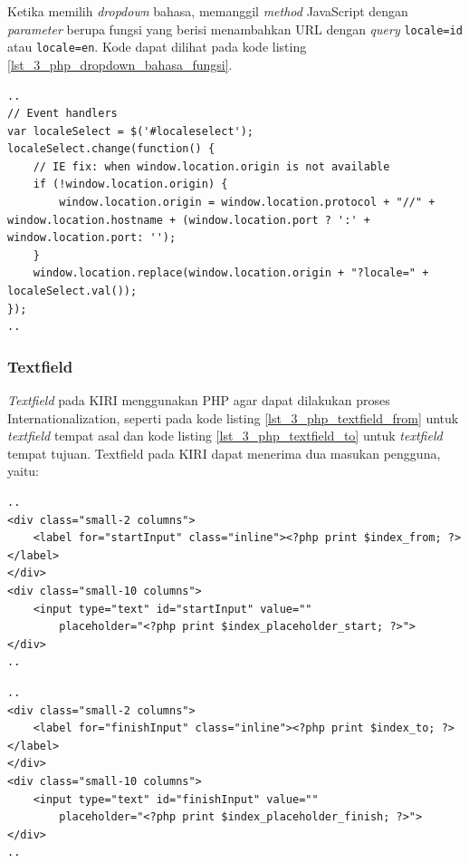 Ketika memilih \textit{dropdown} bahasa, memanggil \textit{method} JavaScript dengan \textit{parameter} berupa fungsi yang berisi menambahkan URL dengan \textit{query} \verb!locale=id! atau \verb!locale=en!. Kode dapat dilihat pada kode listing \ref{lst_3_php_dropdown_bahasa_fungsi}.

\begin{lstlisting}[caption=Fungsi JavaScript untuk Internationalization ,label = {lst_3_php_dropdown_bahasa_fungsi}]
..
// Event handlers
var localeSelect = $('#localeselect');
localeSelect.change(function() {
	// IE fix: when window.location.origin is not available 
	if (!window.location.origin) {
		window.location.origin = window.location.protocol + "//" + window.location.hostname + (window.location.port ? ':' + window.location.port: '');
	}
	window.location.replace(window.location.origin + "?locale=" + localeSelect.val());
});
..
\end{lstlisting}


\subsubsection{Textfield}
\textit{Textfield} pada KIRI menggunakan PHP agar dapat dilakukan proses Internationalization, seperti pada kode listing \ref{lst_3_php_textfield_from} untuk \textit{textfield} tempat asal dan kode listing \ref{lst_3_php_textfield_to} untuk \textit{textfield} tempat tujuan. Textfield pada KIRI dapat menerima dua masukan pengguna, yaitu:

\begin{lstlisting}[caption=Menampilkan \textit{textfield} tempat awal kepada pengguna ,label = {lst_3_php_textfield_from}]
..
<div class="small-2 columns">
	<label for="startInput" class="inline"><?php print $index_from; ?></label>
</div>
<div class="small-10 columns">
	<input type="text" id="startInput" value=""
		placeholder="<?php print $index_placeholder_start; ?>">
</div>
..
\end{lstlisting}

\begin{lstlisting}[caption=Menampilkan \textit{textfield} tempat tujuan kepada pengguna ,label = {lst_3_php_textfield_to}]
..
<div class="small-2 columns">
	<label for="finishInput" class="inline"><?php print $index_to; ?></label>
</div>
<div class="small-10 columns">
	<input type="text" id="finishInput" value=""
		placeholder="<?php print $index_placeholder_finish; ?>">
</div>
..
\end{lstlisting}

